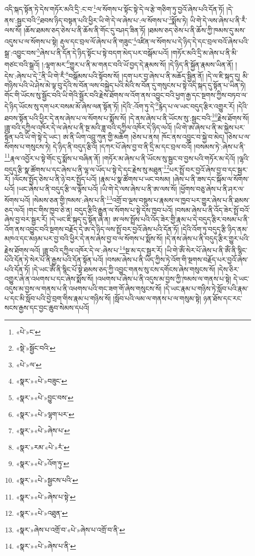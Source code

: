 འདི་སྐད་སྟོན་ཏེ་དེས་གཏོར་མའི་དྲི་:ང་བ་\footnote{«པེ་»ང་}ལ་སོགས་པ་སྟོང་སྟེ་དེ་ལ་རྩེ་གཅིག་ཏུ་བྱའོ་ཞེས་པའི་དོན་ཏོ། །དེ་ནས་:སྦྱང་བའི་\footnote{«སྡེ་»སྦྱོང་བའི་}ཐབས་ཉིད་བསྟན་པའི་ཕྱིར་ཡི་གེ་དེ་ལ་ཞེས་པ་:ལ་སོགས་པ་\footnote{«པེ་»ལ་}སྨོས་ཏེ། ཡི་གེ་དེ་ལས་ཞེས་པ་ནི་རྃ་ལས་སོ། །ཆོས་ཐམས་ཅད་ཅེས་པ་ནི་ཆོས་ནི་གོང་དུ་བཤད་ཟིན་ཏོ། །ཐམས་ཅད་ཅེས་པ་ནི་ཆོས་ཀྱི་ཁམས་དུ་མས་འདུས་པ་ལ་སོགས་པ་སྟེ། རྡུལ་དང་བྲལ་ལོ་ཞེས་པ་ནི་གཟུང་\footnote{«སྣར་»«པེ་»བཟུང་}འཛིན་ལ་སོགས་པ་དེ་ཉིད་དེ་དང་བྲལ་བའོ་ཞེས་པའི་སྒྲ་:འབྱུང་བས་\footnote{«སྣར་»«པེ་»བྱུང་བས་}ཞེས་པ་ནི་དོན་དེ་ཉིད་སྟོང་པ་སྟེ་བདག་མེད་པར་བསྒོམ་པའོ། །གཏོར་མའི་དྲི་མ་ཞེས་པ་ནི་མི་གཙང་བའི་སྒྲའོ། །:ལྷག་མར་\footnote{«སྣར་»«པེ་»ལྷག་པར་}གྱུར་པ་ནི་མ་གནང་བའི་ཡོ་བྱད་དེ་རྣམས་སོ། །དེ་ཉིད་ནི་སྐྱོན་རྣམས་ཡིན་ནོ། །དེས་:ཞེས་པ་དེ་\footnote{«སྣར་»«པེ་»ཞེས་པ་}ནི་ཡི་གེ་རྃ་\footnote{«སྣར་»རམ་«པེ་»རཾ་}བསྒོམས་པའི་སྟོབས་སོ། །དག་པར་བྱ་ཞེས་པ་ནི་མཆོད་སྦྱིན་ནོ། །དེ་ལ་ཇི་སྐད་དུ། མི་གཉིས་པའི་ཡེ་ཤེས་མེ་ལྟ་བུ་དེའི་ས་བོན་ལས་བསྐྱེད་པའི་མེའི་ས་བོན་དུ་གསུངས་པ་སྟེ་འདི་སྐད་དུ་སྟོན་པ་ཡིན་ཏེ། གོང་གི་ཡོངས་སུ་སྦྱོང་བའི་ཡི་གེའི་སྦྱོར་བའི་རྗེས་ཐོགས་ལ་འོག་ནས་འབྱུང་བའི་ཕྱག་རྒྱ་དང་སྔགས་ཀྱིས་བཏབ་ལ་དེ་ཉིད་ཡོངས་སུ་དག་པར་བསམ་མོ་ཞེས་ལན་སྟོན་ཏོ། །དེའི་:འོག་ཏུ་དེ་\footnote{«སྣར་»«པེ་»འོག་ཏུ་}རྙེད་པ་ལ་ཡང་བདུད་རྩིར་འགྱུར་རོ། །དེའི་ཐབས་སྟོན་པའི་ཕྱིར་དེ་ནས་ཞེས་པ་ལ་སོགས་པ་སྨོས་སོ། །དེ་ནས་ཞེས་པ་ནི་ཡོངས་སུ་:སྦྱང་བའི་\footnote{«སྣར་»«པེ་»སྦྱངས་པའི་}རྗེས་ཐོགས་སོ། །ཟླ་བའི་དཀྱིལ་འཁོར་དེ་ལ་ཞེས་པ་ནི་སྔ་མའི་ཟླ་བའི་དཀྱིལ་འཁོར་དེ་ཉིད་ལའོ། །ཡི་གེ་ཨ་ཞེས་པ་ནི་མ་སྐྱེས་པར་སྟོན་པའི་ཡི་གེ་སྟེ་དེ་ཡང་། ཨ་ནི་ཡིག་འབྲུ་ཀུན་གྱི་མཆོག །ཅེས་པ་ནས། ཁོང་ནས་འབྱུང་བ་སྐྱེ་བ་མེད། །ཅེས་པ་ལ་སོགས་པ་གསུངས་ཏེ། དེ་ཉིད་ནི་བདུད་རྩིའོ། །དཀར་པོ་ཞེས་བྱ་བ་ནི་དྲི་མ་དང་བྲལ་བའོ། །བསམས་ཏེ་:ཞེས་པ་ནི་\footnote{«སྣར་»«པེ་»ཞེས་པ་སྟེ་}རྣལ་འབྱོར་པ་སྟེ་གོང་དུ་སྨོས་པ་བཞིན་ནོ། །གཏོར་མ་ཞེས་པ་ནི་ཡོངས་སུ་སྦྱང་བ་བྱས་པའི་གཏོར་མ་དེའོ། །ལྷའི་བདུད་རྩི་སྣ་ཚོགས་པ་དང་ཞེས་པ་ནི་ལྷ་ལ་ཡོད་པ་སྟེ་དེ་དང་རྗེས་སུ་མཐུན་\footnote{«སྣར་»«པེ་»འཐུན་}པར་སྤྲོ་བར་བྱའོ་ཞེས་བྱ་བ་དང་སྦྱར་རོ། །ལོངས་སྤྱོད་ཅེས་པ་ནི་ཉེ་བར་སྤྱོད་པའོ། །རྣམ་པ་སྣ་ཚོགས་པ་ཡང་བསམ། །ཞེས་པ་ནི་ཟས་དང་སྐོམ་ལ་སོགས་པའོ། །ཡང་ཞེས་པ་ནི་བདུད་རྩི་ལ་ལྟོས་པའོ། །ཡི་གེ་དེ་ལས་ཞེས་པ་ནི་ཨ་ལས་སོ། །ཕྱོགས་བཅུ་ཞེས་པ་ནི་ཤར་ལ་སོགས་པའོ། །སེམས་ཅན་གྱི་ཁམས་:ཞེས་པ་ནི་\footnote{«སྣར་»ཞེས་པ་འགྲོ་བ་«པེ་»ཞེས་པ་འགྲོ་བ་ནི་}འགྲོ་བ་ལྔས་བསྡུས་པ་རྣམས་ལ་ཁྱབ་པར་གྱུར་ཞེས་པ་ནི་ཐམས་ཅད་ལའོ། །གང་གིས་ཁྱབ་ཅེ་ན། བདུད་རྩིའི་རྒྱུན་ལ་སོགས་པ་སྟེ་དེས་ཁྱབ་པའོ། །བསམ་ཞེས་པ་ནི་འོད་ཟེར་སྤྲོ་བའོ་ཞེས་བྱ་བར་སྦྱར་རོ། །དེ་ཡང་ཇི་སྐད་དུ་སྟོན་ཞེ་ན། ཨ་ལས་སྤྲོས་པའི་འོད་ཟེར་གྱི་རྣམ་པ་དེ་བདུད་རྩིར་བསམ་པ་ནི་འོག་ནས་འབྱུང་བའི་སྔགས་བརྗོད་དེ་ཨ་དེ་ཉིད་ལས་སྤྲོ་བར་བྱའོ་ཞེས་པའི་དོན་ཏོ། །དེའི་འོག་ཏུ་བདུད་རྩི་ཉིད་ནམ་མཁའ་དང་མཉམ་པར་བྱ་བའི་ཕྱིར་དེ་ནས་ཞེས་བྱ་བ་ལ་སོགས་པ་སྨོས་སོ། །དེ་ནས་ཞེས་པ་ནི་བདུད་རྩིར་གྱུར་པའི་རྗེས་ཐོགས་ལའོ། །ཟླ་བའི་དཀྱིལ་འཁོར་དེ་ལ་:ཞེས་པ་\footnote{«སྣར་»«པེ་»ཞེས་པ་ནི་}སྔ་མ་དང་སྦྱར་རོ། །ཡི་གེ་ཨོཾ་སེར་པོ་ཞེས་པ་ནི་ཨོཾ་ནི་སྙིང་པོའི་དོན་ཏེ་སེར་པོ་ནི་རྒྱས་པའི་དོན་སྟོན་པའོ། །བསམ་ཞེས་པ་ནི་ཡིད་ཀྱིས་ཏེ་འོག་གི་སྔགས་བརྗོད་པར་བྱའོ་ཞེས་པའི་དོན་ཏོ། །དེ་ཡང་ཨོཾ་ནི་སྙིང་པོ་སྟེ་ཐམས་ཅད་ཀྱི་འབྱུང་གནས་སུ་ངས་དགོངས་ཞེས་གསུངས་སོ། །དེས་ཅིར་འགྱུར་ཞེ་ན་འཕགས་པ་དང་ཞེས་སྨོས་སོ། །འཕགས་པ་ཞེས་པ་ནི་འདུས་མ་བྱས་ཀྱི་ཁམས་ལ་གནས་པ་སྟེ། དེ་ཡང་འདུས་མ་བྱས་ལ་གནས་པ་ནི་འཕགས་པའི་གང་ཟག་གོ་ཞེས་གསུངས་སོ། །དེ་ཡང་རྣམ་པ་གཉིས་ཏེ་སློབ་པའི་རྣམ་པ་དང་མི་སློབ་པའི་བྱེ་བྲག་གིས་རྣམ་པ་གཉིས་སོ། །སློབ་པའི་ལམ་ལ་གནས་པ་ལ་གསུམ་སྟེ། ཉན་ཐོས་དང་རང་སངས་རྒྱས་དང་བྱང་ཆུབ་སེམས་དཔའོ། 